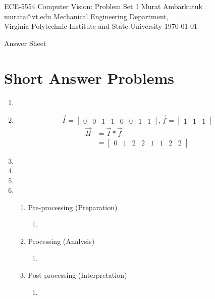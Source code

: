 \documentclass{article}
\begin{document}
\label{Cover}
	\begin{center}
	\large{ECE-5554 Computer Vision: Problem Set 1}
	\vfill
	Murat Ambarkutuk \\ murata@vt.edu
	\vfill
	Mechanical Engineering Department,\\ Virginia Polytechnic Institute and State University
	\vfill
	\today
	\end{center}
\pagebreak 
\large{Answer Sheet}
\label{Short Answer Problems}
\section{Short Answer Problems}
\begin{enumerate}
	\item
	\item 
	$$\vec{I} = \begin{bmatrix} 0 & 0 & 1 & 1 & 0 & 0 & 1 & 1\end{bmatrix}
	, \vec{f}= \begin{bmatrix} 1 & 1 & 1\end{bmatrix}$$
	\begin{equation} 
	\begin{split}
	\vec{H} & = \vec{I} \ast \vec{f} \\
	& = \begin{bmatrix} 0 & 1 & 2 & 2 & 1 & 1 & 2 & 2 \end{bmatrix}
	\end{split}
	\end{equation}
	\item
	\item
	\item
	\item 
	\begin{enumerate}
		\item Pre-processing (Preparation)
		\begin{enumerate}
	    	\item 
		\end{enumerate}
		\item Processing (Analysis)
		\begin{enumerate}
	    	\item 
		\end{enumerate}
		\item Post-processing (Interpretation)
		\begin{enumerate}
	    	\item 
		\end{enumerate}
	\end{enumerate}
\end{enumerate}
\pagebreak
\end{document}
